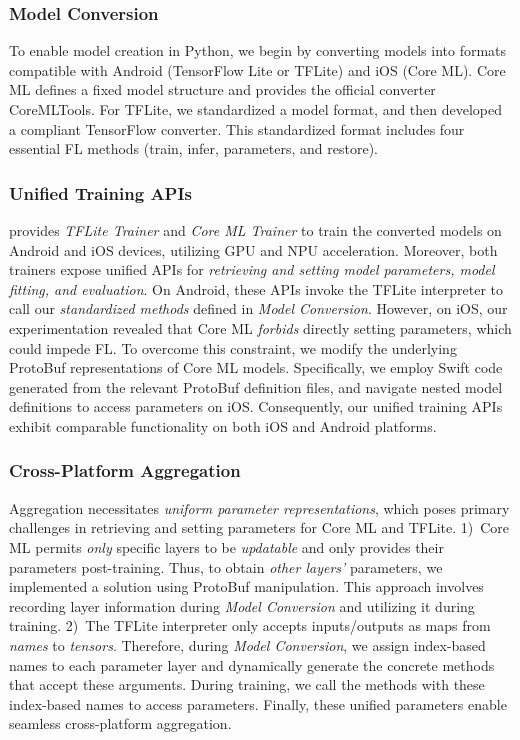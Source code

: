 \documentclass[conference]{IEEEtran}
\begin{document}
\subsubsection{Model Conversion}
To enable model creation in Python,
we begin by converting models into formats compatible with
Android (TensorFlow Lite or TFLite) and iOS (Core ML).
Core ML defines a fixed model structure and provides
the official converter CoreMLTools.
For TFLite, we standardized a model format, and then
developed a compliant TensorFlow converter.
This standardized format includes
four essential FL methods
(\textsf{train}, \textsf{infer}, \textsf{parameters},
and \textsf{restore}).


\subsubsection{Unified Training APIs}
\FedKit{} provides \textit{TFLite Trainer} and \textit{Core ML Trainer} to
train the converted models on Android and iOS devices,
utilizing GPU and NPU acceleration.
Moreover, both trainers expose unified APIs for
\textit{retrieving and setting model parameters,
    model fitting, and evaluation}.
On Android, these APIs invoke the TFLite interpreter to call
our \textit{standardized methods} defined in \textit{Model Conversion}.
However, on iOS, our experimentation revealed that
Core ML \textit{forbids} directly setting parameters, which could impede FL.
To overcome this constraint,
we modify the underlying ProtoBuf representations of
Core ML models.
Specifically,
we employ Swift code generated from the relevant ProtoBuf definition files,
and navigate nested model definitions to access parameters on iOS.
Consequently, our unified training APIs exhibit comparable functionality on
both iOS and Android platforms.


\subsubsection{Cross-Platform Aggregation}
Aggregation necessitates
\textit{uniform parameter representations},
which poses primary challenges in
retrieving and setting parameters for Core ML and TFLite.
1)~Core ML permits \textit{only} specific layers to be \textit{updatable} and
only provides their parameters post-training.
Thus, to obtain \textit{other layers'} parameters,
we implemented a solution using ProtoBuf manipulation.
This approach involves recording layer information
during \textit{Model Conversion} and
utilizing it during training.
2)~The TFLite interpreter only accepts inputs/outputs as maps from
\textit{names} to \textit{tensors}.
Therefore, during \textit{Model Conversion},
we assign index-based names to each parameter layer and
dynamically generate the concrete methods that accept these arguments.
During training, we call the methods with these index-based names to
access parameters.
Finally, these unified parameters enable seamless cross-platform aggregation.
\end{document}
